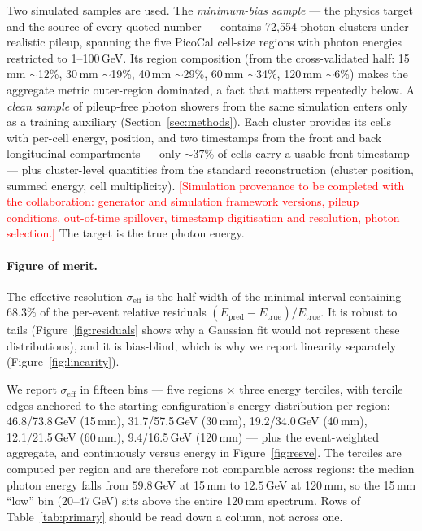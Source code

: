\documentclass[11pt,a4paper]{article}
\newcommand{\seff}{\ensuremath{\sigma_{\mathrm{eff}}}}
\newcommand{\todo}[1]{\textcolor{red}{[#1]}}
\begin{document}
Two simulated samples are used. The \emph{minimum-bias sample} --- the
physics target and the source of every quoted number --- contains 72{,}554
photon clusters under realistic pileup, spanning the five PicoCal cell-size
regions with photon energies restricted to 1--100\,GeV. Its region
composition (from the cross-validated half: 15\,mm $\sim$12\%, 30\,mm
$\sim$19\%, 40\,mm $\sim$29\%, 60\,mm $\sim$34\%, 120\,mm $\sim$6\%) makes
the aggregate metric outer-region dominated, a fact that matters repeatedly
below. A \emph{clean sample} of pileup-free photon showers from the same
simulation enters only as a training auxiliary
(Section~\ref{sec:methods}). Each cluster provides its cells with per-cell
energy, position, and two timestamps from the front and back longitudinal
compartments --- only $\sim$$37\%$ of cells carry a usable front timestamp ---
plus cluster-level quantities from the standard reconstruction (cluster
position, summed energy, cell multiplicity).
\todo{Simulation provenance to be completed with the collaboration:
generator and simulation framework versions, pileup conditions, out-of-time
spillover, timestamp digitisation and resolution, photon selection.} The
target is the true photon energy.

\paragraph{Figure of merit.} The effective resolution \seff{} is the
half-width of the minimal interval containing $68.3\%$ of the per-event
relative residuals $(E_{\mathrm{pred}}-E_{\mathrm{true}})/E_{\mathrm{true}}$.
It is robust to tails (Figure~\ref{fig:residuals} shows why a Gaussian fit
would not represent these distributions), and it is bias-blind, which is why
we report linearity separately (Figure~\ref{fig:linearity}).

We report \seff{} in fifteen bins --- five regions $\times$ three energy
terciles, with tercile edges anchored to the starting configuration's energy
distribution per region: 46.8/73.8\,GeV (15\,mm), 31.7/57.5\,GeV (30\,mm),
19.2/34.0\,GeV (40\,mm), 12.1/21.5\,GeV (60\,mm), 9.4/16.5\,GeV (120\,mm) ---
plus the event-weighted aggregate, and continuously versus energy in
Figure~\ref{fig:resve}. The terciles are computed per region and are
therefore not comparable across regions: the median photon energy falls from
$59.8$\,GeV at 15\,mm to $12.5$\,GeV at 120\,mm, so the 15\,mm ``low''
bin ($20$--$47$\,GeV) sits above the entire 120\,mm spectrum. Rows of
Table~\ref{tab:primary} should be read down a column, not across one.
\end{document}
